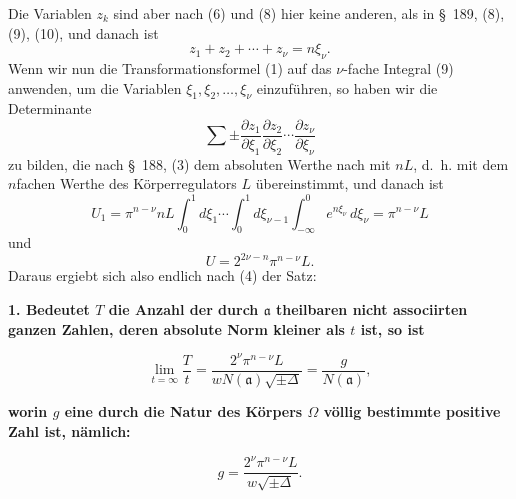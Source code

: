 \documentclass[11pt]{article}
\begin{document}
Die Variablen $z_k$ sind aber nach (6) und (8) hier keine anderen, als in \S~189, (8), (9), (10), und danach ist
\[
z_1+z_2+\cdots+z_\nu=n\xi_\nu.
\]
Wenn wir nun die Transformationsformel (1) auf das $\nu$-fache Integral (9) anwenden, um die Variablen $\xi_1,\xi_2,\ldots,\xi_\nu$ einzuführen, so haben wir die Determinante
\[
\sum\pm
\frac{\partial z_1}{\partial\xi_1}
\frac{\partial z_2}{\partial\xi_2}\cdots
\frac{\partial z_\nu}{\partial\xi_\nu}
\]
zu bilden, die nach \S~188, (3) dem absoluten Werthe nach mit $nL$, d.~h. mit dem $n$fachen Werthe des Körperregulators $L$ übereinstimmt, und danach ist
\[
U_1=\pi^{n-\nu}nL\int_0^1d\xi_1\cdots\int_0^1d\xi_{\nu-1}\int_{-\infty}^{0}e^{n\xi_\nu}\,d\xi_\nu
=\pi^{n-\nu}L
\]
und
\[
U=2^{2\nu-n}\pi^{n-\nu}L.
\]
Daraus ergiebt sich also endlich nach (4) der Satz:

\begin{center}
\textbf{1. Bedeutet $T$ die Anzahl der durch $\mathfrak a$ theilbaren nicht associirten ganzen Zahlen, deren absolute Norm kleiner als $t$ ist, so ist}
\end{center}
\begin{equation}
\lim_{t=\infty}\frac{T}{t}
=
\frac{2^\nu\pi^{n-\nu}L}{wN(\mathfrak a)\sqrt{\pm\Delta}}
=
\frac{g}{N(\mathfrak a)},
\tag{10}
\end{equation}
\begin{center}
\textbf{worin $g$ eine durch die Natur des Körpers $\Omega$ völlig bestimmte positive Zahl ist, nämlich:}
\end{center}
\begin{equation}
g=\frac{2^\nu\pi^{n-\nu}L}{w\sqrt{\pm\Delta}}.
\tag{11}
\end{equation}
\end{document}

